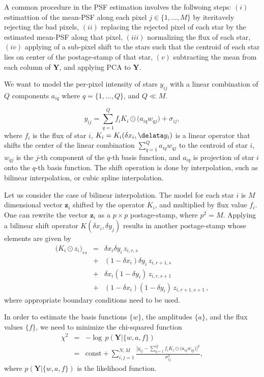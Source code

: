 \documentclass[12pt, preprint]{aastex}
\newcommand{\beq}{\begin{equation}}
\newcommand{\eeq}{\end{equation}}
\begin{document}
A common procedure in the PSF estimation involves the follwoing steps: $(i)$ estimattion of the mean-PSF along each pixel $j\in\{1,...,M\}$
by iteritavely rejecting the bad pixels, $(ii)$ replacing the rejected pixel of each star by the estimated mean-PSF along that pixel, $(iii)$ 
normalizing the flux of each star, $(iv)$ applying of a sub-pixel shift to the stars such that the centroid of each star lies on center 
of the postage-stamp of that star, $(v)$ subtracting the mean from each column of $\mathbf{Y}$, and applying PCA to $\mathbf{Y}$.

We want to model the per-pixel intensity of stars $y_{ij}$ with a linear combination of $Q$ components $a_{iq}$ where $q=\{1,...,Q\}$, and $Q\ll M$.

\beq
y_{ij} = \sum_{q=1}^{Q} f_{i}K_{i}\odot\big(a_{iq}w_{qj}\big) + \sigma_{ij},
\eeq
where $f_{i}$ is the flux of star $i$, $K_{i} = K_{i}(\delta x_{i} , \delata y_{i})$ is a linear operator that shifts the 
center of the linear combination $\sum_{q=1}^{Q}a_{iq}w_{qj}$ to the centroid of star $i$, $w_{qj}$ is the 
$j$-th component of the $q$-th basis function, and $a_{iq}$ is projection of star $i$ onto the $q$-th basis function. The shift
operation is done by interpolation, such as bilinear interpolation, or cubic spline interpolation. 

Let us consider the case of 
bilinear interpolation. The model for each star $i$ is $M$ dimensional vector $\mathbf{z}_{i}$ shifted by the operator $K_{i}$,
and multiplied by flux value $f_{i}$. One can rewrite the vector $\mathbf{z}_{i}$ as a $p\times p$ postage-stamp, where $p^{2}=M$.
Applying a bilinear shift operator $K(\delta x_{i} , \delta y_{j})$ results in another postage-stamp whose elements are given by
\begin{eqnarray}
\big(K_{i}\odot z_{i}\big)_{rs} &=& \delta x_{i} \delta y_{i} \, z_{i,r,s} \nonumber \\
                                &+& (1 - \delta x_{i}) \delta y_{i} \, z_{i,r+1,s} \nonumber \\ 
                                &+& \delta x_{i} (1-\delta y_{i}) \, z_{i,r,s+1} \nonumber \\ 
                                &+& (1 - \delta x_{i})(1-\delta y_{i}) \, z_{i,r+1,s+1} \, ,
\end{eqnarray}
where appropriate boundary conditions need to be used. 

In order to estimate the basis functions $\{w\}$, the amplitudes $\{a\}$, and the flux values $\{f\}$, we need to
minimize the chi-squared function
\begin{eqnarray}
\chi^{2} &=& - \log \, p(\mathbf{Y}|\{w,a,f\}) \\
         &=& \text{const} + \sum_{i,j=1}^{N,M} \frac{\Big[y_{ij} - 
             \sum_{q=1}^{Q} f_{i}K_{i}\odot\big(a_{iq}w_{qj}\big)\Big]^{2}}{\sigma_{ij}^{2}},
\end{eqnarray}
where $p(\mathbf{Y}|\{w,a,f\})$ is the likelihood function.
\end{document}
